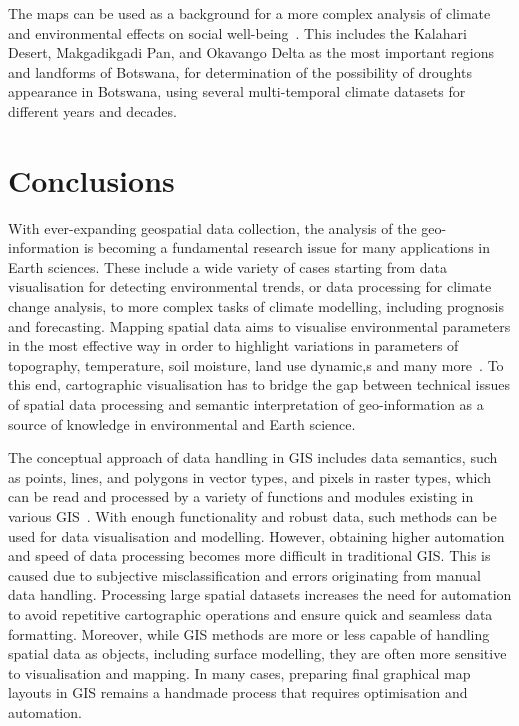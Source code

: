 \documentclass[ijgi,article,accept,pdftex,moreauthors]{Definitions/mdpi}
\begin{document}
The maps can be used as a background for a more complex analysis of climate and environmental effects on social well-being~\cite{Asefa,Vanderpost1995,Rahm,Mogomotsi}. This includes the Kalahari Desert, Makgadikgadi Pan, and Okavango Delta as the most important regions and landforms of Botswana, for determination of the possibility of droughts appearance in Botswana, using several multi-temporal climate datasets for different years and decades. 

\section{Conclusions}

With ever-expanding geospatial data collection, the analysis of the geo-information is becoming a fundamental research issue for many applications in Earth sciences. These include a wide variety of cases starting from data visualisation for detecting environmental trends, or data processing for climate change analysis, to more complex tasks of climate modelling, including prognosis and forecasting. Mapping spatial data aims to visualise environmental parameters in the most effective way in order to highlight variations in parameters of topography, temperature, soil moisture, land use dynamic,s and many more~\cite{Moreri,Mpofu,Lemenkova202203,Ramberg2006a,LANCASTER2022318}. To this end, cartographic visualisation has to bridge the gap between technical issues of spatial data processing and semantic interpretation of geo-information as a source of knowledge in environmental and Earth science. 

The conceptual approach of data handling in GIS includes data semantics, such as points, lines, and polygons in vector types, and pixels in raster types, which can be read and processed by a variety of functions and modules existing in various GIS~\cite{ijgi11040257,Lemenkova202140,ijgi9110631}. With enough functionality and robust data, such methods can be used for data visualisation and modelling. However, obtaining higher automation and speed of data processing becomes more difficult in traditional GIS. This is caused due to subjective misclassification and errors originating from manual data handling. Processing large spatial datasets increases the need for automation to avoid repetitive cartographic operations and ensure quick and seamless data formatting. Moreover, while GIS methods are more or less capable of handling spatial data as objects, including surface modelling, they are often more sensitive to visualisation and mapping. In many cases, preparing final graphical map layouts in GIS remains a handmade process that requires optimisation and automation.
\end{document}
